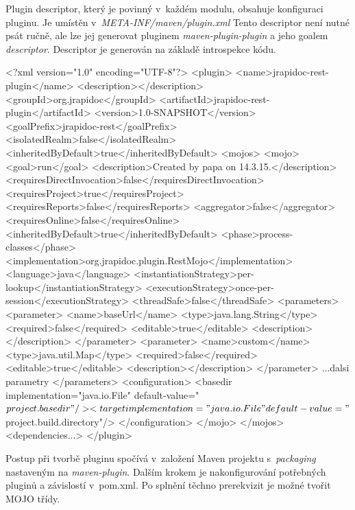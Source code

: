 \documentclass[11pt,twoside,a4paper]{book}
\begin{document}
Plugin descriptor, který je povinný v~každém modulu, obsahuje konfiguraci pluginu. Je
umístěn v~{\em META-INF/maven/plugin.xml} Tento descriptor není nutné psát
ručně, ale lze jej generovat pluginem {\em maven-plugin-plugin} a jeho goalem
{\em descriptor}. Descriptor je generován na základě introspekce kódu.

\begin{code}[frame=single,caption={Ukázka plugin descriptoru}]
<?xml version="1.0" encoding="UTF-8"?>
<plugin>
  <name>jrapidoc-rest-plugin</name>
  <description></description>
  <groupId>org.jrapidoc</groupId>
  <artifactId>jrapidoc-rest-plugin</artifactId>
  <version>1.0-SNAPSHOT</version>
  <goalPrefix>jrapidoc-rest</goalPrefix>
  <isolatedRealm>false</isolatedRealm>
  <inheritedByDefault>true</inheritedByDefault>
  <mojos>
    <mojo>
      <goal>run</goal>
      <description>Created by papa on 14.3.15.</description>
      <requiresDirectInvocation>false</requiresDirectInvocation>
      <requiresProject>true</requiresProject>
      <requiresReports>false</requiresReports>
      <aggregator>false</aggregator>
      <requiresOnline>false</requiresOnline>
      <inheritedByDefault>true</inheritedByDefault>
      <phase>process-classes</phase>
      <implementation>org.jrapidoc.plugin.RestMojo</implementation>
      <language>java</language>
      <instantiationStrategy>per-lookup</instantiationStrategy>
      <executionStrategy>once-per-session</executionStrategy>
      <threadSafe>false</threadSafe>
      <parameters>
        <parameter>
          <name>baseUrl</name>
          <type>java.lang.String</type>
          <required>false</required>
          <editable>true</editable>
          <description></description>
        </parameter>
        <parameter>
          <name>custom</name>
          <type>java.util.Map</type>
          <required>false</required>
          <editable>true</editable>
          <description></description>
        </parameter>
    ...dalsi parametry
      </parameters>
      <configuration>
        <basedir implementation="java.io.File" 
        default-value="${project.basedir}"/>
        <target implementation="java.io.File" 
        default-value="${project.build.directory}"/>
      </configuration>
    </mojo>
  </mojos>
  <dependencies...>
</plugin>
\end{code}

Postup při tvorbě pluginu spočívá v~založení Maven projektu s~{\em packaging}
nastaveným na {\em maven-plugin}. Dalším krokem je nakonfigurování potřebných
pluginů a závislostí v~pom.xml.
Po splnění těchno prerekvizit je možné tvořit MOJO třídy.
\end{document}
